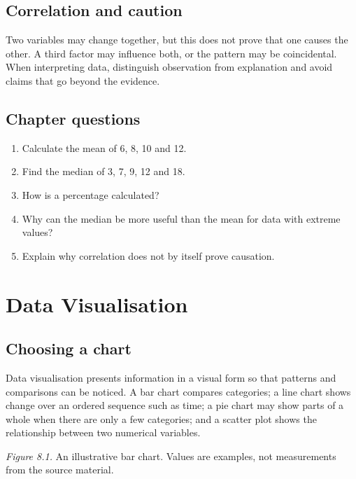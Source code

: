 \documentclass[11pt,openany,oneside]{book}
\begin{document}
\section{Correlation and caution}
Two variables may change together, but this does not prove that one causes the other. A third factor may influence both, or the pattern may be coincidental. When interpreting data, distinguish observation from explanation and avoid claims that go beyond the evidence.

\section{Chapter questions}
\begin{enumerate}
\item Calculate the mean of 6, 8, 10 and 12.
\item Find the median of 3, 7, 9, 12 and 18.
\item How is a percentage calculated?
\item Why can the median be more useful than the mean for data with extreme values?
\item Explain why correlation does not by itself prove causation.
\end{enumerate}

\chapter{Data Visualisation}
\section{Choosing a chart}
Data visualisation presents information in a visual form so that patterns and comparisons can be noticed. A bar chart compares categories; a line chart shows change over an ordered sequence such as time; a pie chart may show parts of a whole when there are only a few categories; and a scatter plot shows the relationship between two numerical variables.

\begin{center}
\end{center}
\textit{Figure 8.1.} An illustrative bar chart. Values are examples, not measurements from the source material.
\end{document}

